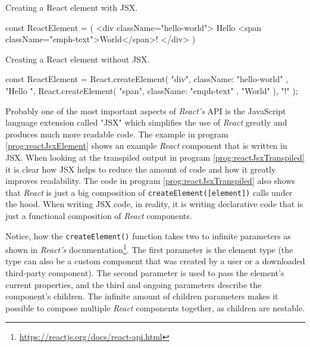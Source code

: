 \begin{program}
\caption{Creating a React element with JSX.} 
\label{prog:reactJsxElement}
\begin{JsCode}
const ReactElement = (
  <div className="hello-world">
    Hello <span className="emph-text">World</span>!
  </div>
)
\end{JsCode}
\end{program}

\begin{program}
\caption{Creating a React element without JSX.} 
\label{prog:reactJsxTranspiled}
\begin{JsCode}
const ReactElement = React.createElement(
  "div", 
  { className: "hello-world" }, 
  "Hello ", 
  React.createElement(
    "span", 
    { className: "emph-text" }, 
    "World"
  ), 
  "!"
);
\end{JsCode}
\end{program}

Probably one of the most important aspects of \emph{React's} API is the JavaScript language extension called "JSX" which simplifies the use of \emph{React} greatly and produces much more readable code. The example in program \ref{prog:reactJsxElement} shows an example \emph{React} component that is written in JSX. When looking at the transpiled output in program \ref{prog:reactJsxTranspiled} it is clear how JSX helps to reduce the amount of code and how it greatly improves readability. The code in program \ref{prog:reactJsxTranspiled} also shows that \emph{React} is just a big composition of \texttt{createElement([element])} calls under the hood. When writing JSX code, in reality, it is writing declarative code that is just a functional composition of \emph{React} components. 

Notice, how the \texttt{createElement()} function takes two to infinite parameters as shown in \emph{React's} documentation\footnote{\url{https://reactjs.org/docs/react-api.html}}. The first parameter is the element type (the type can also be a custom component that was created by a user or a downloaded third-party component). The second parameter is used to pass the element's current properties, and the third and ongoing parameters describe the component's children. The infinite amount of children parameters makes it possible to compose multiple \emph{React} components together, as children are nestable. 


